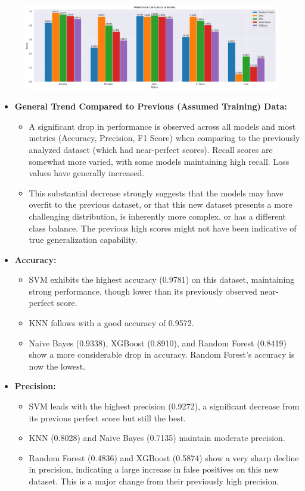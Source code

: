 \begin{figure}[H]
    \centering
    \includegraphics[width=\linewidth]{images/models_performance_validating}
    \caption{}
    \label{fig:models_performance_validating}
\end{figure}

\begin{itemize}
    \item \textbf{General Trend Compared to Previous (Assumed Training) Data:}
    \begin{itemize}
        \item A significant drop in performance is observed across all models and most metrics (Accuracy, Precision, F1 Score) when comparing to the previously analyzed dataset (which had near-perfect scores). Recall scores are somewhat more varied, with some models maintaining high recall. Loss values have generally increased.
        \item This substantial decrease strongly suggests that the models may have overfit to the previous dataset, or that this new dataset presents a more challenging distribution, is inherently more complex, or has a different class balance. The previous high scores might not have been indicative of true generalization capability.
    \end{itemize}

    \item \textbf{Accuracy:}
    \begin{itemize}
        \item SVM exhibits the highest accuracy (0.9781) on this dataset, maintaining strong performance, though lower than its previously observed near-perfect score.
        \item KNN follows with a good accuracy of 0.9572.
        \item Naive Bayes (0.9338), XGBoost (0.8910), and Random Forest (0.8419) show a more considerable drop in accuracy. Random Forest's accuracy is now the lowest.
    \end{itemize}

    \item \textbf{Precision:}
    \begin{itemize}
        \item SVM leads with the highest precision (0.9272), a significant decrease from its previous perfect score but still the best.
        \item KNN (0.8028) and Naive Bayes (0.7135) maintain moderate precision.
        \item Random Forest (0.4836) and XGBoost (0.5874) show a very sharp decline in precision, indicating a large increase in false positives on this new dataset. This is a major change from their previously high precision.
    \end{itemize}


\end{itemize}
